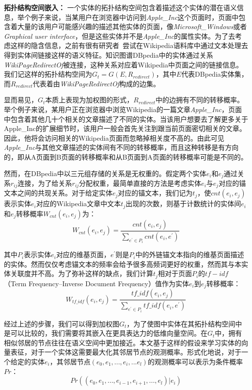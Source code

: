 \textbf{拓扑结构空间嵌入：}
一个实体的拓扑结构空间包含着描述这个实体的潜在语义信息，举个例子来说，当某用户在浏览器中访问到\emph{Apple\_Inc}这个页面时，页面中包含着大量的该用户可能感兴趣的描述其他实体的页面，像\emph{Microsoft\_Windows}或者\emph{Graphical user interface}，但是这些实体并不是\emph{Apple\_Inc}的属性实体。为了去考虑这样的隐含信息，之前有很有研究者~\cite{aaai/ZhangZH15, aaai/GongXH18}尝试在Wikipedia语料库中通过文本处理去得到实体间链接这样的语义特征。知识图谱DBpedia中的实体通过关系\emph{WikiPageRedirectOf}被连接，这种关系对应着Wikipedia中页面之间的链接信息。我们记这样的拓扑结构空间为$G_t = G(E, R_{redirect})$，其中$E$代表DBpedia实体集，而$R_{redirect}$代表着由\emph{WikiPageRedirectOf}构成的边集。

显而易见，$G_t$本质上表现为加权图的形式，$R_{redirect}$中的边拥有不同的转移概率。举个例子来说，某用户正在浏览器中浏览Wikipedia的一篇文章\emph{Apple\_Inc}，页面中包含着其他几十个相关的文章描述了不同的实体。当该用户想要去了解更多关于{Apple\_Inc}的扩展细节时，该用户一般会首先关注到跟当前页面密切相关的文章。因此，他将会访问相关的Wikipedia页面而忽略掉相关度不高的。由此可见\emph{Apple\_Inc}与其他文章描述的实体间有不同的转移概率，而且这种转移是有方向的，即从A页面到B页面的转移概率和从B页面到A页面的转移概率可能是不同的。

然而，在DBpedia中以三元组存储的关系是无权重的。假定两个实体$e_i$和$e_j$通过关系$r_{ij}$连接，为了给关系$r_{ij}$分配权重，最简单直接的方法是考虑实体$e_i$与$e_j$对应的锚文本之间的共现关系。对于给定实体$e_j$对应的锚文本，我们记为$t_j$，使$cnt(e_i, e_j)$表示实体$e_i$对应的Wikipedia文章中文本$t_j$出现的次数，则基于计数统计的实体间$e_i$和$e_j$转移概率$W_{cnt}(e_i, e_j)$为：
\begin{equation}
    \label{cng_formula}
    W_{cnt}(e_i, e_j) = \frac{cnt(e_i, e_j)}{\sum_{e^{'} \in P_i}^{ }cnt(e_i, e^{'})}
\end{equation}

\noindent 其中$P_i$表示实体$e_i$对应的维基页面，$e^{'}$则是$P_i$中的外链锚文本指向的维基页面描述的实体。然而仅仅考虑锚文本的频率会给予很多高频词更好的权重，然而其与本实体关联度并不高。为了弥补这样的缺点，我们计算$t_j$相对于页面$P_i$的$tf-idf$（Term Frequency–Inverse Document Frequency）值作为实体$e_i$到$e_j$转移概率：
\begin{equation}
    \label{w_tf-idf_formula}
    W_{tf\_idf}(e_i, e_j) = \frac{tf\_idf(e_i, e_j)}{\sum_{e^{'} \in P_i}^{ }tf\_idf(e_i, e^{'})}
\end{equation}



经过上述的步骤，我们可以得到加权图$G_t$，为了使图中实体在其拓扑结构空间中是可以比较的，我们需要将其嵌入在更具表达力的低维向量空间。在$G_t$中，拥有相似邻居的节点往往在语义空间中更加接近。本文基于这样的假设来学习实体的向量表征，对于一个实体这需要最大化其邻居节点的观测概率。形式化地说，对于一个给定的实体$e_i$，其邻居节点$(e_0, e_1, ..., e_i, ...e_l)$的观测概率可以表示为条件概率$Pr$：
\begin{equation}
    \label{pr}
    Pr((e_0, e_1, ..., e_{i-1}, e_{i+1}, ..., e_l)|e_i)
\end{equation}

